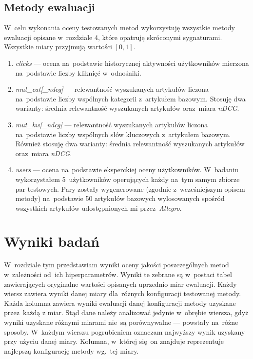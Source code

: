 \documentclass[pl]{minipw} %
\begin{document}
\section{Metody ewaluacji}

W~celu wykonania oceny testowanych metod wykorzystuję wszystkie metody ewaluacji opisane w~rozdziale 4, które opatruję skróconymi sygnaturami. Wszystkie miary przyjmują wartości $[0,1]$.
\begin{enumerate}
	\item \textit{clicks} --- ocena na~podstawie historycznej aktywności użytkowników mierzona na~podstawie liczby kliknięć w~odnośniki.
	\item \textit{mut\_cat[\_ndcg]} --- relewantność wyszukanych artykułów liczona na~podstawie liczby wspólnych kategorii z~artykułem bazowym. Stosuję dwa warianty: średnia relewantność wyszukanych artykułów oraz~miara \textit{nDCG}.
	\item \textit{mut\_kw[\_ndcg]} --- relewantność wyszukanych artykułów liczona na~podstawie liczby wspólnych słów kluczowych z~artykułem bazowym. Również stosuję dwa warianty: średnia relewantność wyszukanych artykułów oraz~miara \textit{nDCG}.
	\item \textit{users} --- ocena na~podstawie eksperckiej oceny użytkowników. W~badaniu wykorzystałem 5~użytkowników operujących każdy na~tym samym zbiorze par testowych. Pary zostały wygenerowane (zgodnie z~wcześniejszym opisem metody) na~podstawie 50 artykułów bazowych wylosowanych spośród wszystkich artykułów udostępnionych mi przez~\textit{Allegro}.
\end{enumerate}

\chapter{Wyniki badań}
W~rozdziale tym przedstawiam wyniki oceny jakości poszczególnych metod w~zależności od~ich hiperparametrów. Wyniki te zebrane są w~postaci tabel zawierających oryginalne wartości opisanych uprzednio miar ewaluacji. Każdy wiersz zawiera wyniki danej miary dla~różnych konfiguracji testowanej metody. Każda kolumna zawiera wyniki ewaluacji danej konfiguracji metody uzyskane przez~każdą z miar. Stąd dane należy analizować jedynie w~obrębie wiersza, gdyż wyniki uzyskane różnymi miarami nie~są porównywalne --- powstały na~różne sposoby. W~każdym wierszu pogrubieniem oznaczam najwyższy wynik uzyskany przy użyciu danej miary. Kolumna, w~której się on znajduje reprezentuje najlepszą konfigurację metody wg.~tej miary.
\end{document}
